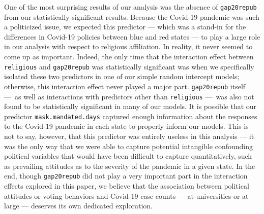 \documentclass[
]{article}
\begin{document}
One of the most surprising results of our analysis was the absence of
\texttt{gap20repub} from our statistically significant results. Because
the Covid-19 pandemic was such a politicized issue, we expected this
predictor --- which was a stand-in for the differences in Covid-19
policies between blue and red states --- to play a large role in our
analysis with respect to religious affiliation. In reality, it never
seemed to come up as important. Indeed, the only time that the
interaction effect between \texttt{religious} and \texttt{gap20repub}
was statistically significant was when we specifically isolated these
two predictors in one of our simple random intercept models; otherwise,
this interaction effect never played a major part. \texttt{gap20repub}
itself ---~as well as interactions with predictors other than
\texttt{religious} ---~was also not found to be statistically
significant in many of our models. It is possible that our predictor
\texttt{mask.mandated.days} captured enough information about the
responses to the Covid-19 pandemic in each state to properly inform our
models. This is not to say, however, that this predictor was entirely
useless in this analysis --- it was the only way that we were able to
capture potential intangible confounding political variables that would
have been difficult to capture quantitatively, such as prevailing
attitudes as to the severity of the pandemic in a given state. In the
end, though \texttt{gap20repub} did not play a very important part in
the interaction effects explored in this paper, we believe that the
association between political attitudes or voting behaviors and Covid-19
case counts --- at universities or at large --- deserves its own
dedicated exploration.
\end{document}
